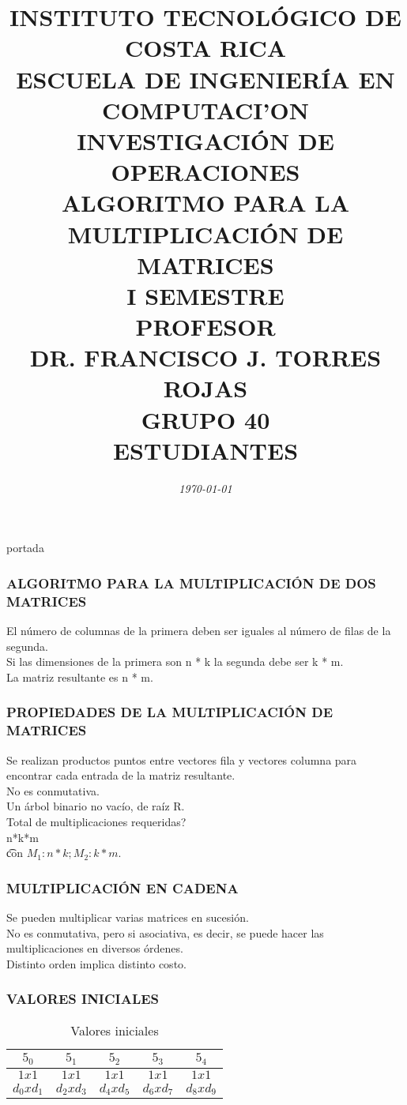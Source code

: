 \documentclass[10]{beamer}
\title{{\color{WHITE} \large \textbf{INSTITUTO TECNOL\'OGICO DE COSTA RICA}} \\ \vspace{0.02cm} 
{\color{WHITE} \large \textbf{ESCUELA DE INGENIER\'IA EN COMPUTACI'ON }} \\ \vspace{0.02cm} 
{\color{WHITE} \large \textbf{INVESTIGACI\'ON DE OPERACIONES  }} \\ \vspace{0.02cm} 
{\color{WHITE} \large \textbf{ALGORITMO PARA LA \\ MULTIPLICACI\'ON DE MATRICES  }} \\ \vspace{0.02cm} 
{\color{WHITE} \large \textbf{I SEMESTRE  }}\\ \vspace{0.02cm}
{\color{WHITE} \large \textbf{PROFESOR}} \\ \vspace{0.02cm}
{\color{WHITE} \large DR. FRANCISCO J. TORRES ROJAS  } \\ \vspace{0.02cm}
{\color{WHITE} \large \textbf{GRUPO 40}} \\ \vspace{0.01cm}
{\color{WHITE} \large \textbf{ESTUDIANTES} }}
\date{\em \color{WHITE} \today}
\begin{document}
\begin{frame}
\color{white}
\titlepage portada
\end{frame} 
\begin{frame}
\color{white}
\frametitle{ALGORITMO PARA LA MULTIPLICACI\'ON DE DOS MATRICES}
El n\'umero de columnas de la primera deben ser iguales al n\'umero de filas de la segunda.
\\ Si las dimensiones de la primera son n * k la segunda debe ser k * m.
\\ La matriz resultante es n * m.
\end{frame} 
\begin{frame}
\color{white}
\frametitle{PROPIEDADES DE LA MULTIPLICACI\'ON DE MATRICES}
Se realizan productos puntos entre vectores fila y vectores columna para encontrar cada entrada de la matriz resultante.
\\ No es conmutativa.
\\Un \'arbol binario no vac\'io, de ra\'iz R.
\\ Total de multiplicaciones requeridas? \\ n*k*m  \\ \t con $M_1:n*k; M_2: k*m$.
\end{frame} 
\begin{frame}
\color{white}
\frametitle{MULTIPLICACI\'ON EN CADENA}
Se pueden multiplicar varias matrices en sucesi\'on.
\\ No es conmutativa, pero si asociativa, es decir, se puede hacer las multiplicaciones en diversos \'ordenes.
\\ Distinto orden implica distinto costo.
\end{frame} 
\begin{frame}\frametitle{VALORES INICIALES}
 \color{white}
\begin{table}
 \begin{tabular}{ c | c  | c  | c  | c }
 \\  $5_0$ & $5_1$   & $5_2$   & $5_3$   & $5_4$  \\ 
 \hline \hline 
 $1x1$ & $1x1$   & $1x1$   & $1x1$   & $1x1$   \\ 
 $d_0xd_1$ & $d_2xd_3$   & $d_4xd_5$   & $d_6xd_7$   & $d_8xd_9$   
 \end{tabular}
 \color{white}
\caption{Valores iniciales}
 \end{table}
 \end{frame} 
\end{document}
